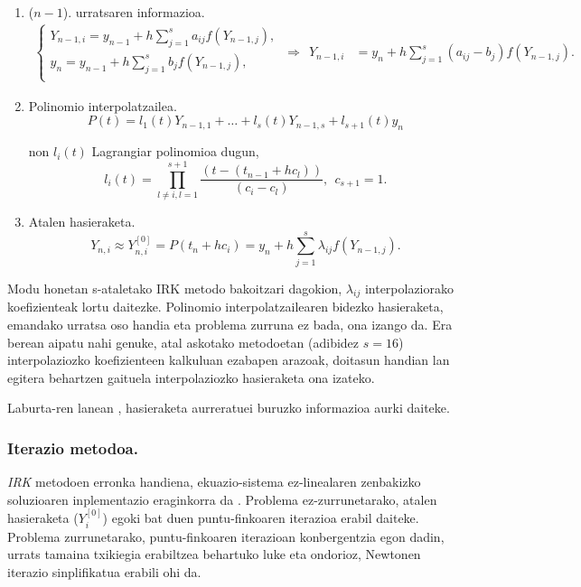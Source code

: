 \begin{enumerate}
\item ($n-1$). urratsaren informazioa.
\begin{align*}
\left \{ \begin{array}{c}
Y_{n-1,i} =y_{n-1}+h \sum\limits_{j=1}^{s} a_{ij} f(Y_{n-1,j}),\\
y_n =y_{n-1}+h \sum\limits_{j=1}^{s} b_j f(Y_{n-1,j}),\\
\end{array} \right.
\ \Rightarrow \ \ 
Y_{n-1,i} &=y_n+h \sum\limits_{j=1}^{s} (a_{ij}-b_j) f(Y_{n-1,j}).
\end{align*}

\item Polinomio interpolatzailea.
\begin{equation*}
P(t)=  l_1(t) Y_{n-1,1}+\dots+l_s(t) Y_{n-1,s}+l_{s+1}(t) y_n
\end{equation*}
  
non $l_i(t)$ Lagrangiar polinomioa dugun,
\begin{equation*}
 l_i(t)=\prod_{l\neq i,l=1}^{s+1} \frac{(t-(t_{n-1}+hc_l))}{(c_i-c_l)}, \ \ c_{s+1}=1.
\end{equation*}

\item Atalen hasieraketa.
\begin{equation*}
Y_{n,i} \approx Y_{n,i}^{[0]}= P(t_n+hc_i) = y_n+ h \sum\limits_{j=1}^{s} \lambda_{ij}f(Y_{n-1,j}).
\end{equation*}

\end{enumerate}

Modu honetan s-ataletako IRK metodo bakoitzari dagokion, $\lambda_{ij}$ interpolaziorako koefizienteak lortu daitezke. Polinomio interpolatzailearen bidezko hasieraketa, emandako urratsa oso handia eta problema zurruna ez bada, ona izango da. Era berean aipatu nahi genuke, atal askotako metodoetan (adibidez $s=16$)  interpolaziozko koefizienteen kalkuluan ezabapen arazoak, doitasun handian lan egitera behartzen gaituela interpolaziozko hasieraketa ona izateko.   

Laburta-ren lanean \cite{Laburta1998}, hasieraketa aurreratuei buruzko informazioa aurki daiteke.  


\subsubsection*{Iterazio metodoa.}

\emph{IRK} metodoen erronka handiena, ekuazio-sistema ez-linealaren zenbakizko soluzioaren inplementazio eraginkorra da \cite{Hairer2006,SSerna2015b}. Problema ez-zurrunetarako, atalen hasieraketa ($Y_i^{[0]}$) egoki bat duen puntu-finkoaren iterazioa erabil daiteke. Problema zurrunetarako, puntu-finkoaren iterazioan konbergentzia egon dadin, urrats tamaina txikiegia erabiltzea behartuko luke eta ondorioz, Newtonen iterazio sinplifikatua erabili ohi da.  

